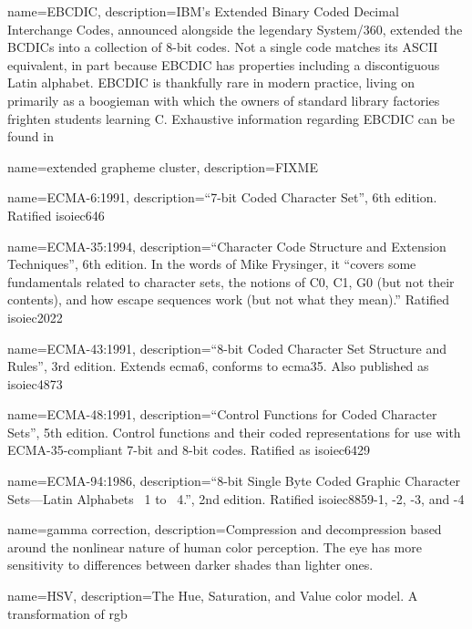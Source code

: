 {
  name={EBCDIC},
  description={IBM's Extended Binary Coded Decimal Interchange Codes, announced
    alongside the legendary System/360, extended the BCDICs into a collection
    of 8-bit codes. Not a single code matches its ASCII equivalent, in part
    because EBCDIC has properties including a discontiguous Latin alphabet.
    EBCDIC is thankfully rare in modern practice, living on primarily as
    a boogieman with which the owners of standard library factories frighten
    students learning C. Exhaustive information regarding EBCDIC can be found
    in \cite{codedcharactersets}}
}

{
  name={extended grapheme cluster},
description={FIXME }
}

{
  name={ECMA-6:1991},
  description={``7-bit Coded Character Set'', 6th edition. Ratified
    \Gls{isoiec646}}
}

{
  name={ECMA-35:1994},
  description={``Character Code Structure and Extension Techniques'', 6th
    edition. In the words of Mike Frysinger, it ``covers some fundamentals
    related to character sets, the notions of \Gls{C0}, C1, G0 (but not their
    contents), and how escape sequences work (but not what they mean)\cite{hterm}.''
    Ratified \Gls{isoiec2022}}
}

{
  name={ECMA-43:1991},
    description={``8-bit Coded Character Set Structure and Rules'', 3rd edition. Extends
      \Gls{ecma6}, conforms to \Gls{ecma35}. Also published as \Gls{isoiec4873}}
}

{
  name={ECMA-48:1991},
  description={``Control Functions for Coded Character Sets'', 5th edition.
    Control functions and their coded representations for use with ECMA-35-compliant
    7-bit and 8-bit codes.
   Ratified as \Gls{isoiec6429}}
}

{
  name={ECMA-94:1986},
  description={``8-bit Single Byte Coded Graphic Character Sets---Latin
    Alphabets \textnumero\ 1 to \textnumero\ 4.'', 2nd edition. Ratified
    \Gls{isoiec8859}-1, -2, -3, and -4}
}

{
  name={gamma correction},
  description={Compression and decompression based around the nonlinear nature
   of human color perception. The eye has more sensitivity to differences between
   darker shades than lighter ones.}
}

{
  name={HSV},
  description={The Hue, Saturation, and Value color model. A transformation of \Gls{rgb}}
}


